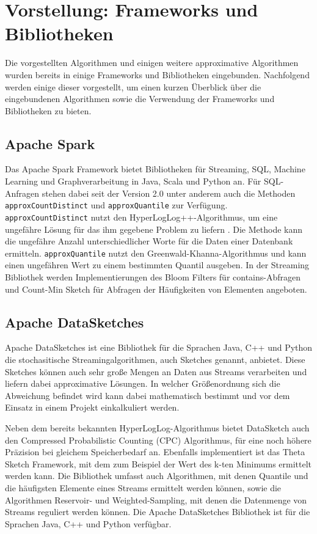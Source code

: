 \section{Vorstellung: Frameworks und Bibliotheken}
Die vorgestellten Algorithmen und einigen weitere approximative Algorithmen wurden bereits in einige Frameworks und Bibliotheken eingebunden. Nachfolgend werden einige dieser vorgestellt, um einen kurzen Überblick über die eingebundenen Algorithmen sowie die Verwendung der Frameworks und Bibliotheken zu bieten.

\subsection{Apache Spark}
Das Apache Spark Framework bietet Bibliotheken für Streaming, SQL, Machine Learning und Graphverarbeitung in Java, Scala und Python an. 
Für SQL-Anfragen stehen dabei seit der Version 2.0 unter anderem auch die Methoden \texttt{approxCountDistinct} 
und \texttt{approxQuantile} zur Verfügung. 
\texttt{approxCountDistinct} nutzt den Hyper\-LogLog++-Algorithmus, 
um eine ungefähre Lösung für das ihm gegebene Problem zu liefern \cite{hunter2016}.
Die Methode kann die ungefähre Anzahl unterschiedlicher Worte für die Daten einer Datenbank ermitteln.
\texttt{approxQuantile} nutzt den Greenwald-Khanna-Algorithmus \cite{greenwald2001} 
und kann einen ungefähren Wert zu einem bestimmten Quantil ausgeben.
In der Streaming Bibliothek werden Implementierungen des Bloom Filters für contains-Abfragen und Count-Min Sketch für Abfragen der Häufigkeiten von Elementen angeboten.

\subsection{Apache DataSketches}
Apache DataSketches ist eine Bibliothek für die Sprachen Java, C++ und Python die stochasitische Streamingalgorithmen, 
auch Sketches genannt, anbietet. 
Diese Sketches können auch sehr große Mengen an Daten aus Streams verarbeiten 
und liefern dabei approximative Lösungen. 
In welcher Größenordnung sich die Abweichung befindet wird kann dabei mathematisch bestimmt 
und vor dem Einsatz in einem Projekt einkalkuliert werden.

Neben dem bereits bekannten HyperLogLog-Algorithmus bietet DataSketch auch den Compressed Probabilistic Counting (CPC) Algorithmus, 
für eine noch höhere Präzision bei gleichem Speicherbedarf an.
Ebenfalls implementiert ist das Theta Sketch Framework, 
mit dem zum Beispiel der Wert des k-ten Minimums ermittelt werden kann.
Die Bibliothek umfasst auch Algorithmen, mit denen Quantile und die häufigsten Elemente eines Streams ermittelt werden können, 
sowie die Algorithmen Reservoir- und Weighted-Sampling, mit denen die Datenmenge von Streams reguliert werden können.
Die Apache DataSketches Bibliothek ist für die Sprachen Java, C++ und Python verfügbar.

